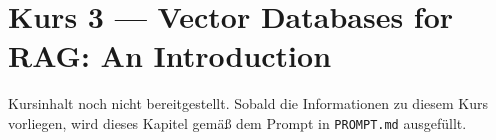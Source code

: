 \chapter{Kurs 3 --- Vector Databases for RAG: An Introduction}

\begin{luecke}
Kursinhalt noch nicht bereitgestellt. Sobald die Informationen zu diesem Kurs vorliegen,
wird dieses Kapitel gem\"a\ss{} dem Prompt in \texttt{PROMPT.md} ausgef\"ullt.
\end{luecke}

